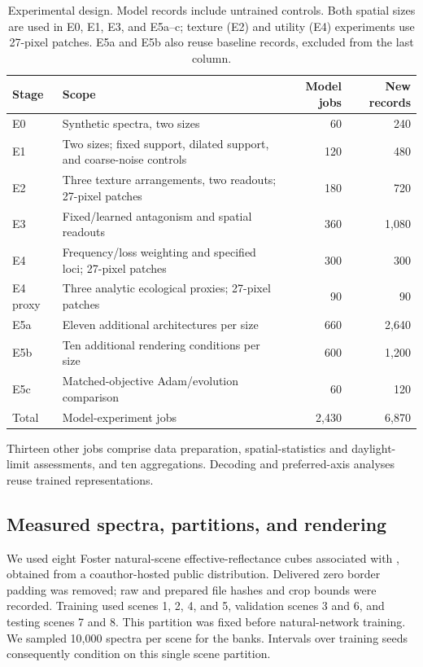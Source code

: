\documentclass[authoryear,preprint,review,12pt]{elsarticle}
\begin{document}
\begin{table}[htbp]\centering\small
\caption{Experimental design. Model records include untrained controls. Both spatial sizes are used in E0, E1, E3, and E5a--c; texture (E2) and utility (E4) experiments use 27-pixel patches. E5a and E5b also reuse baseline records, excluded from the last column.}\label{tab:design}
\begin{tabularx}{\textwidth}{lXrr}\toprule
Stage & Scope & Model jobs & New records\\\midrule
E0 & Synthetic spectra, two sizes & 60 & 240\\
E1 & Two sizes; fixed support, dilated support, and coarse-noise controls & 120 & 480\\
E2 & Three texture arrangements, two readouts; 27-pixel patches & 180 & 720\\
E3 & Fixed/learned antagonism and spatial readouts & 360 & 1,080\\
E4 & Frequency/loss weighting and specified loci; 27-pixel patches & 300 & 300\\
E4 proxy & Three analytic ecological proxies; 27-pixel patches & 90 & 90\\
E5a & Eleven additional architectures per size & 660 & 2,640\\
E5b & Ten additional rendering conditions per size & 600 & 1,200\\
E5c & Matched-objective Adam/evolution comparison & 60 & 120\\\midrule
Total & Model-experiment jobs & 2,430 & 6,870\\\bottomrule
\end{tabularx}
\par\smallskip\footnotesize Thirteen other jobs comprise data preparation, spatial-statistics and daylight-limit assessments, and ten aggregations. Decoding and preferred-axis analyses reuse trained representations.
\end{table}

\subsection{Measured spectra, partitions, and rendering}\label{sec:data}
We used eight Foster natural-scene effective-reflectance cubes associated with \citet{nascimento2002statistics}, obtained from a coauthor-hosted public distribution. Delivered zero border padding was removed; raw and prepared file hashes and crop bounds were recorded. Training used scenes 1, 2, 4, and 5, validation scenes 3 and 6, and testing scenes 7 and 8. This partition was fixed before natural-network training. We sampled 10,000 spectra per scene for the banks. Intervals over training seeds consequently condition on this single scene partition.
\end{document}
